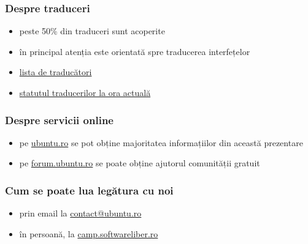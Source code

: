 \documentclass[compress]{beamer}
\begin{document}
\begin{frame}
\frametitle{Despre traduceri}

\begin{itemize}[<+->]
  \item peste 50\% din traduceri sunt acoperite
  \item în principal atenția este orientată spre traducerea interfețelor
  \item \href{https://launchpad.net/~ubuntu-ro/+members}{lista de traducători}
  \item \href{https://translations.launchpad.net/ubuntu/quantal/+lang/ro}{statutul traducerilor la ora actuală}
\end{itemize}
\end{frame}

\begin{frame}
\frametitle{Despre servicii online}

\begin{itemize}[<+->]
  \item pe \href{http://ubuntu.ro}{ubuntu.ro} se pot obține majoritatea informațiilor din această prezentare
  \item pe \href{http://forum.ubuntu.ro}{forum.ubuntu.ro} se poate obține ajutorul comunității gratuit

\end{itemize}
\end{frame}

\begin{frame}
\frametitle{Cum se poate lua legătura cu noi}

\begin{itemize}[<+->]
  \item prin email la \href{mailto://contact@ubuntu.ro}{contact@ubuntu.ro}
  \item în persoană, la \href{http://camp.softwareliber.ro/}{camp.softwareliber.ro}
\end{itemize}
\end{frame}
\end{document}
